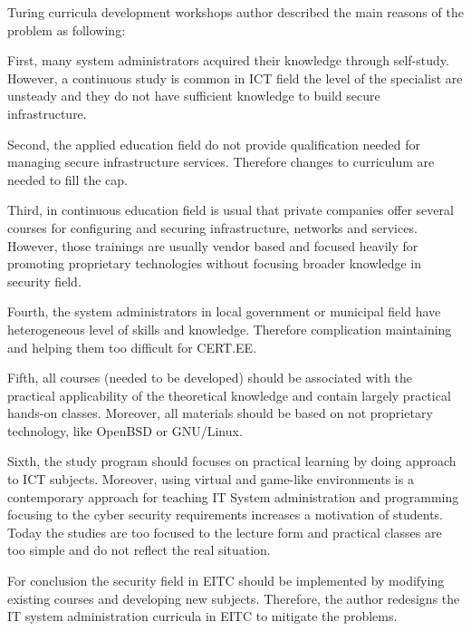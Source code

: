 Turing curricula development workshops author described the main reasons of the problem as following:

First, many system administrators acquired their knowledge through self-study. However, a continuous study is common in \gls{ICT} field the level of the specialist are unsteady and they do not have sufficient knowledge to build secure infrastructure.

Second, the applied education field do not provide qualification needed for managing secure infrastructure services. Therefore changes to curriculum are needed to fill the cap.

Third, in continuous education field is usual that private companies offer several courses for configuring and securing infrastructure, networks and services. However, those trainings are usually vendor based and focused heavily for promoting proprietary technologies without focusing broader knowledge in security field. 

Fourth, the system administrators in local government or municipal field have heterogeneous level of skills and knowledge. Therefore complication maintaining and helping them too difficult for \gls{CERT.EE}.

Fifth, all courses (needed to be developed) should be associated with the practical applicability of the theoretical knowledge and contain largely practical hands-on classes. Moreover, all materials should be based on not proprietary technology, like \gls{OpenBSD} or \gls{GNU/Linux}.

Sixth, the study program should focuses on practical learning by doing approach to \gls{ICT} subjects.
 Moreover, using virtual and game-like environments is a contemporary approach for teaching IT System administration and programming focusing to the cyber security requirements increases a motivation of students. Today the studies are too focused to the lecture form and practical classes are too simple and do not reflect the real situation.
 
For conclusion the security field in \gls{EITC} should be implemented by modifying existing courses and developing new subjects. Therefore, the author redesigns the IT system administration curricula in \gls{EITC} to mitigate the problems.



